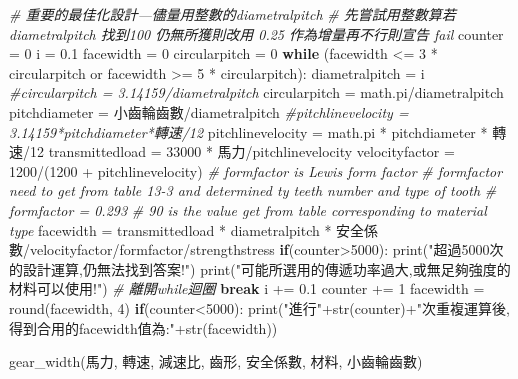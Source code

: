 \documentclass[]{article}
\newenvironment{Shaded}{}{}
\newcommand{\KeywordTok}[1]{\textcolor[rgb]{0.00,0.44,0.13}{\textbf{{#1}}}}
\newcommand{\DataTypeTok}[1]{\textcolor[rgb]{0.56,0.13,0.00}{{#1}}}
\newcommand{\DecValTok}[1]{\textcolor[rgb]{0.25,0.63,0.44}{{#1}}}
\newcommand{\FloatTok}[1]{\textcolor[rgb]{0.25,0.63,0.44}{{#1}}}
\newcommand{\StringTok}[1]{\textcolor[rgb]{0.25,0.44,0.63}{{#1}}}
\newcommand{\CommentTok}[1]{\textcolor[rgb]{0.38,0.63,0.69}{\textit{{#1}}}}
\newcommand{\NormalTok}[1]{{#1}}
\begin{document}
\begin{Shaded}
\begin{Highlighting}[]
    \CommentTok{# 重要的最佳化設計---儘量用整數的diametralpitch}
    \CommentTok{# 先嘗試用整數算若 diametralpitch 找到100 仍無所獲則改用 0.25 作為增量再不行則宣告 fail}
    \NormalTok{counter = }\DecValTok{0}
    \NormalTok{i = }\FloatTok{0.1}
    \NormalTok{facewidth = }\DecValTok{0}
    \NormalTok{circularpitch = }\DecValTok{0}
    \KeywordTok{while} \NormalTok{(facewidth <= }\DecValTok{3} \NormalTok{* circularpitch or facewidth >= }\DecValTok{5} \NormalTok{* circularpitch):}
        \NormalTok{diametralpitch = i}
        \CommentTok{#circularpitch = 3.14159/diametralpitch}
        \NormalTok{circularpitch = math.pi/diametralpitch}
        \NormalTok{pitchdiameter = 小齒輪齒數/diametralpitch}
        \CommentTok{#pitchlinevelocity = 3.14159*pitchdiameter*轉速/12}
        \NormalTok{pitchlinevelocity = math.pi * pitchdiameter * 轉速/}\DecValTok{12}
        \NormalTok{transmittedload = }\DecValTok{33000} \NormalTok{* 馬力/pitchlinevelocity}
        \NormalTok{velocityfactor = }\DecValTok{1200}\NormalTok{/(}\DecValTok{1200} \NormalTok{+ pitchlinevelocity)}
        \CommentTok{# formfactor is Lewis form factor}
        \CommentTok{# formfactor need to get from table 13-3 and determined ty teeth number and type of tooth}
        \CommentTok{# formfactor = 0.293}
        \CommentTok{# 90 is the value get from table corresponding to material type}
        \NormalTok{facewidth = transmittedload * diametralpitch * 安全係數/velocityfactor/formfactor/strengthstress}
        \KeywordTok{if}\NormalTok{(counter>}\DecValTok{5000}\NormalTok{):}
            \DataTypeTok{print}\NormalTok{(}\StringTok{"超過5000次的設計運算,仍無法找到答案!"}\NormalTok{)}
            \DataTypeTok{print}\NormalTok{(}\StringTok{"可能所選用的傳遞功率過大,或無足夠強度的材料可以使用!"}\NormalTok{)}
            \CommentTok{# 離開while迴圈}
            \KeywordTok{break}
        \NormalTok{i += }\FloatTok{0.1}
        \NormalTok{counter += }\DecValTok{1}
    \NormalTok{facewidth = }\DataTypeTok{round}\NormalTok{(facewidth, }\DecValTok{4}\NormalTok{)}
    \KeywordTok{if}\NormalTok{(counter<}\DecValTok{5000}\NormalTok{):}
        \DataTypeTok{print}\NormalTok{(}\StringTok{"進行"}\NormalTok{+}\DataTypeTok{str}\NormalTok{(counter)+}\StringTok{"次重複運算後,得到合用的facewidth值為:"}\NormalTok{+}\DataTypeTok{str}\NormalTok{(facewidth))}

\NormalTok{gear_width(馬力, 轉速, 減速比, 齒形, 安全係數, 材料, 小齒輪齒數)}
\end{Highlighting}
\end{Shaded}
\end{document}
